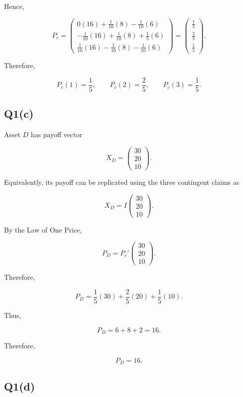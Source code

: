\documentclass{article}
\begin{document}
Hence,

\[
P_c
=
\begin{pmatrix}
0(16)+\frac{1}{10}(8)-\frac{1}{10}(6)\\[4pt]
-\frac{1}{10}(16)+\frac{1}{10}(8)+\frac{1}{5}(6)\\[4pt]
\frac{1}{10}(16)-\frac{1}{10}(8)-\frac{1}{10}(6)
\end{pmatrix}
=
\begin{pmatrix}
\frac{1}{5}\\
\frac{2}{5}\\
\frac{1}{5}
\end{pmatrix}.
\]

Therefore,

\[
\boxed{
P_c(1)=\frac{1}{5},
\qquad
P_c(2)=\frac{2}{5},
\qquad
P_c(3)=\frac{1}{5}.
}
\]

\subsection{Q1(c)}

Asset \(D\) has payoff vector

\[
X_D=
\begin{pmatrix}
30\\
20\\
10
\end{pmatrix}.
\]

Equivalently, its payoff can be replicated using the three contingent claims as

\[
X_D
=
I
\begin{pmatrix}
30\\
20\\
10
\end{pmatrix}.
\]

By the Law of One Price,

\[
P_D
=
P_c'
\begin{pmatrix}
30\\
20\\
10
\end{pmatrix}.
\]

Therefore,

\[
P_D
=
\frac{1}{5}(30)
+
\frac{2}{5}(20)
+
\frac{1}{5}(10).
\]

Thus,

\[
P_D
=
6+8+2
=
16.
\]

Therefore,

\[
\boxed{P_D=16.}
\]

\subsection{Q1(d)}
\end{document}

